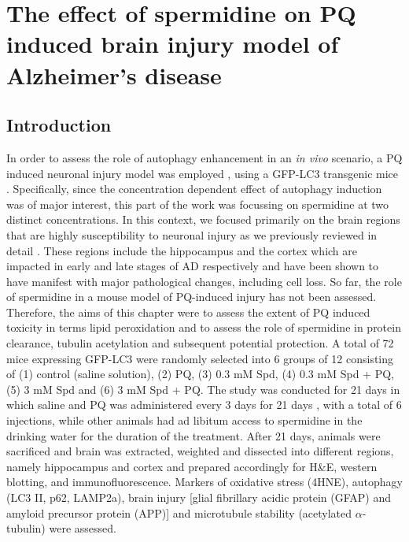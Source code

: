 \chapter{The effect of spermidine on PQ induced brain injury model of Alzheimer’s disease}
\section{Introduction}
In order to assess the role of autophagy enhancement in an \textit{in vivo} scenario, a PQ induced neuronal injury model was employed \citep{Chen2012}, using a GFP-LC3 transgenic mice \citep{Mizushima2004a}. Specifically, since the concentration dependent effect of autophagy induction was of major interest, this part of the work was focussing on spermidine at two distinct concentrations. In this context, we focused primarily on the brain regions that are highly susceptibility to neuronal injury as we previously reviewed in detail \citep{lumkwana2017}. These regions include the hippocampus and the cortex which are impacted in early and late stages of AD respectively and have been shown to have manifest with major pathological changes, including cell loss. So far, the role of spermidine in a mouse model of PQ-induced injury has not been assessed. Therefore, the aims of this chapter were to assess the extent of PQ induced toxicity in terms lipid peroxidation and to assess the role of spermidine in protein clearance, tubulin acetylation and subsequent potential protection. A total of 72 mice expressing GFP-LC3 were randomly selected into 6 groups of 12 consisting of (1) control (saline solution), (2) PQ, (3) 0.3 mM Spd, (4) 0.3 mM Spd + PQ, (5) 3 mM Spd and (6) 3 mM Spd + PQ. The study was conducted for 21 days in which saline and PQ was administered every 3 days for 21 days \citep{Chen2012}, with a total of 6 injections, while other animals had ad libitum access to spermidine in the drinking water for the duration of the treatment. After 21 days, animals were sacrificed and brain was extracted, weighted and dissected into different regions, namely hippocampus and cortex and prepared accordingly for H\&E, western blotting, and immunofluorescence. Markers of oxidative stress (4HNE), autophagy (LC3 II, p62, LAMP2a), brain injury [glial fibrillary acidic protein (GFAP) and amyloid precursor protein (APP)] and microtubule stability (acetylated $\alpha$-tubulin) were assessed. 

